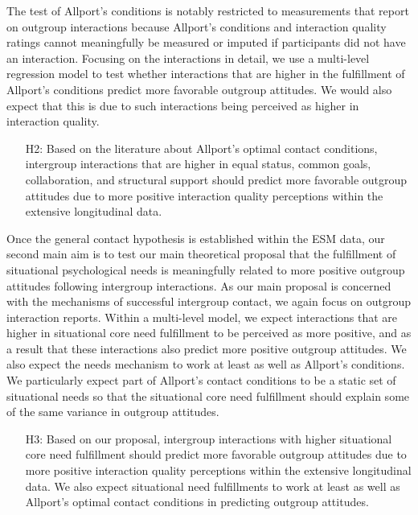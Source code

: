 \documentclass[man, 12pt, a4paper, mask]{apa7}
\theoremstyle{break}
\theoremstyle{plain}
\begin{document}
The test of Allport's conditions is notably restricted to measurements that report on outgroup interactions because Allport's conditions and interaction quality ratings cannot meaningfully be measured or imputed if participants did not have an interaction. Focusing on the interactions in detail, we use a multi-level regression model to test whether interactions that are higher in the fulfillment of Allport's conditions predict more favorable outgroup attitudes. We would also expect that this is due to such interactions being perceived as higher in interaction quality.
\begin{enumerate}[leftmargin=1.5\parindent]
    \item[H2:] Based on the literature about Allport’s optimal contact conditions, intergroup interactions that are higher in equal status, common goals, collaboration, and structural support should predict more favorable outgroup attitudes due to more positive interaction quality perceptions within the extensive longitudinal data.
\end{enumerate}

Once the general contact hypothesis is established within the ESM data, our second main aim is to test our main theoretical proposal that the fulfillment of situational psychological needs is meaningfully related to more positive outgroup attitudes following intergroup interactions. As our main proposal is concerned with the mechanisms of successful intergroup contact, we again focus on outgroup interaction reports. Within a multi-level model, we expect interactions that are higher in situational core need fulfillment to be perceived as more positive, and as a result that these interactions also predict more positive outgroup attitudes. We also expect the needs mechanism to work at least as well as Allport's conditions. We particularly expect part of Allport's contact conditions to be a static set of situational needs so that the situational core need fulfillment should explain some of the same variance in outgroup attitudes.
\begin{enumerate}[leftmargin=1.5\parindent]
    \item[H3:] Based on our proposal, intergroup interactions with higher situational core need fulfillment should predict more favorable outgroup attitudes due to more positive interaction quality perceptions within the extensive longitudinal data. We also expect situational need fulfillments to work at least as well as Allport's optimal contact conditions in predicting outgroup attitudes.
\end{enumerate}
\end{document}
